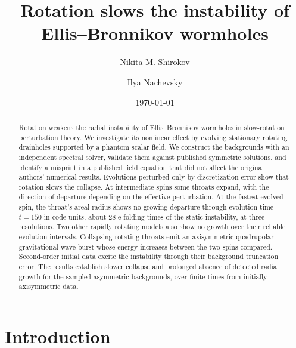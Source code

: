 \documentclass[twocolumn,floatfix,aps,prd,superscriptaddress,nofootinbib]{revtex4-2}
\begin{document}
\raggedbottom

\title{Rotation slows the instability of Ellis--Bronnikov wormholes}

\author{Nikita M. Shirokov}
\author{Ilya Nachevsky}
\date{\today}

\begin{abstract}
Rotation weakens the radial instability of Ellis--Bronnikov wormholes in slow-rotation perturbation theory. We investigate its nonlinear effect by evolving stationary rotating drainholes supported by a phantom scalar field. We construct the backgrounds with an independent spectral solver, validate them against published symmetric solutions, and identify a misprint in a published field equation that did not affect the original authors' numerical results. Evolutions perturbed only by discretization error show that rotation slows the collapse. At intermediate spins some throats expand, with the direction of departure depending on the effective perturbation. At the fastest evolved spin, the throat's areal radius shows no growing departure through evolution time $t=150$ in code units, about 28 e-folding times of the static instability, at three resolutions. Two other rapidly rotating models also show no growth over their reliable evolution intervals. Collapsing rotating throats emit an axisymmetric quadrupolar gravitational-wave burst whose energy increases between the two spins compared. Second-order initial data excite the instability through their background truncation error. The results establish slower collapse and prolonged absence of detected radial growth for the sampled asymmetric backgrounds, over finite times from initially axisymmetric data.
\end{abstract}

\maketitle

\section{Introduction}
\label{sec:intro}
\end{document}
